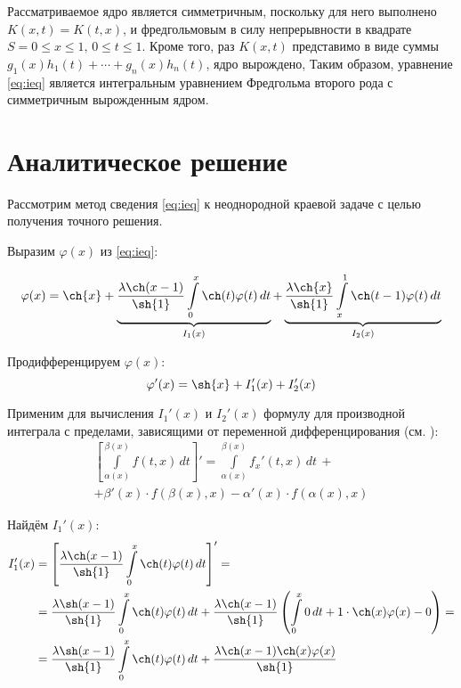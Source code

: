 \documentclass{article}
\numberwithin{equation}{section}
\renewcommand{\phi}{\varphi}
\renewcommand{\leq}{\leqslant}
\newcommand{\intl}{\int\limits}
\begin{document}
Рассматриваемое ядро является симметричным, поскольку для него
выполнено $K(x, t) = K(t, x)$, и фредгольмовым в силу непрерывности в
квадрате $S={0\leq x \leq 1,\, 0 \leq t \leq 1}$. Кроме того, раз
$K(x, t)$ представимо в виде суммы $g_1(x)h_1(t) + \dotsb + g_n(x)
h_n(t)$, ядро вырождено, Таким образом, уравнение \eqref{eq:ieq}
является интегральным уравнением Фредгольма второго рода с
симметричным вырожденным ядром.

\clearpage
\section{Аналитическое решение}

Рассмотрим метод сведения \eqref{eq:ieq} к неоднородной краевой задаче
с целью получения точного решения.

Выразим $\phi(x)$ из \eqref{eq:ieq}:

\begin{equation}
  \label{eq:phi}
  \phi(x) = \ch{x} + 
  \underbrace{\frac{\lambda \ch(x-1)}{\sh{1}}\intl_0^x{\ch(t) \phi(t)\,dt}}_{I_1(x)} +
  \underbrace{\frac{\lambda \ch{x}}{\sh{1}}\intl_x^1{\ch(t-1)\phi(t)\,dt}}_{I_2(x)}
\end{equation}

Продифференцируем $\phi(x)$:
\begin{equation*}
  \phi'(x) = \sh{x} + I_1'(x) + I_2'(x)
\end{equation*}

Применим для вычисления $I_1'(x)$ и $I_2'(x)$ формулу для производной
интеграла с пределами, зависящими от переменной дифференцирования (см.
\cite{fikhtengolz03}):
\begin{multline}\label{eq:intdiff}
  \left [ \intl_{\alpha(x)}^{\beta(x)}{f(t, x)\,dt} \right ] ' = 
  \intl_{\alpha(x)}^{\beta(x)}{{f_x}'(t, x)\,dt}\, + \\
  + \beta'(x)\cdot f(\beta(x), x) -
  \alpha'(x)\cdot f(\alpha(x), x)
\end{multline}

Найдём $I_1'(x)$:
\begin{align*}
  I_1'(x) &= \left[ \frac{\lambda \ch(x-1)}{\sh{1}}\intl_0^x{\ch(t) \phi(t)\,dt} \right] ' = \\
  &= \frac{\lambda \sh(x-1)}{\sh{1}}\intl_0^x{\ch(t)\phi(t)\,dt} +
  \frac{\lambda \ch(x-1)}{\sh{1}} \left ( \intl_0^x{0\,dt} +
    1 \cdot \ch(x) \phi(x) - 0 \right) = \\
  &= \frac{\lambda \sh(x-1)}{\sh{1}}\intl_0^x{\ch(t)\phi(t)\,dt} +
  \frac{\lambda \ch(x-1) \ch(x) \phi(x)}{\sh{1}}    
\end{align*}
\end{document}
